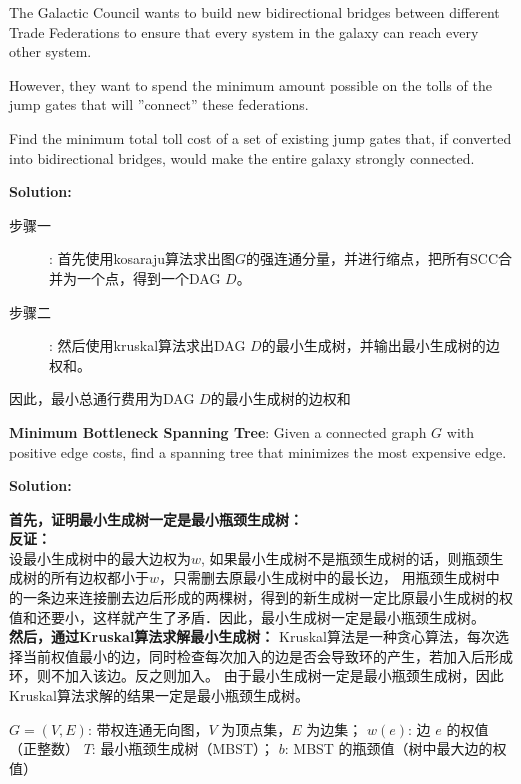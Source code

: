 \documentclass{article}
\newcounter{exercise}
\newcommand{\solution}{
    \vspace{0.2in}
    \noindent
    {\bf Solution:}
    }
\newcommand{\<}{
    \langle}
\renewcommand{\>}{
    \rangle}
\begin{document}
{\begin{exercise}
The Galactic Council wants to build new bidirectional bridges between different Trade Federations to ensure that every system in the galaxy can reach every other system.

However, they want to spend the minimum amount possible on the tolls of the jump gates that will ''connect'' these federations.

Find the minimum total toll cost of a set of existing jump gates that, if converted into bidirectional bridges, would make the entire galaxy strongly connected.
\end{exercise}

\solution{
\begin{description}
    \item[步骤一]: 首先使用kosaraju算法求出图$G$的强连通分量，并进行缩点，把所有SCC合并为一个点，得到一个DAG $D$。
    \item[步骤二]: 然后使用kruskal算法求出DAG $D$的最小生成树，并输出最小生成树的边权和。
\end{description}
因此，最小总通行费用为DAG $D$的最小生成树的边权和
}


\begin{exercise}
 \textbf{Minimum Bottleneck Spanning Tree}: Given a connected graph $ G $ with positive edge costs, find a
 spanning tree that {minimizes the most expensive edge}.
\end{exercise}

\solution{
\textbf{首先，证明最小生成树一定是最小瓶颈生成树：}\\
\textbf{反证：}\\
设最小生成树中的最大边权为$w$, 如果最小生成树不是瓶颈生成树的话，则瓶颈生成树的所有边权都小于$w$，只需删去原最小生成树中的最长边，
用瓶颈生成树中的一条边来连接删去边后形成的两棵树，得到的新生成树一定比原最小生成树的权值和还要小，这样就产生了矛盾．因此，最小生成树一定是最小瓶颈生成树。\\
\textbf{然后，通过Kruskal算法求解最小生成树：}
Kruskal算法是一种贪心算法，每次选择当前权值最小的边，同时检查每次加入的边是否会导致环的产生，若加入后形成环，则不加入该边。反之则加入。
由于最小生成树一定是最小瓶颈生成树，因此Kruskal算法求解的结果一定是最小瓶颈生成树。\\
\begin{algorithm}[H]
    \caption{Kruskal's Algorithm for Minimum Bottleneck Spanning Tree (MBST)}
    \label{alg:kruskal}
    \begin{algorithmic}[1] 
        \Require 
            $G = (V, E)$: 带权连通无向图，$V$ 为顶点集，$E$ 为边集；
            $w(e)$: 边 $e$ 的权值（正整数）
        \Ensure 
            $T$: 最小瓶颈生成树（MBST）；
            $b$: MBST 的瓶颈值（树中最大边的权值）
        

\end{algorithmic}
\end{algorithm}}}
\end{document}
